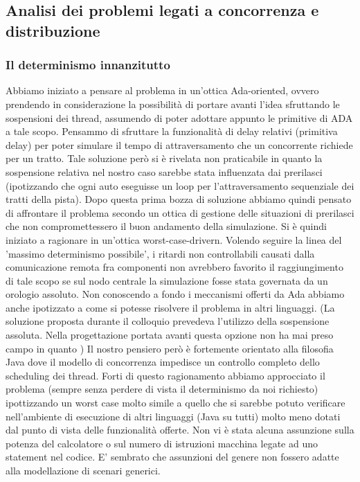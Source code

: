 \subsection{Analisi dei problemi legati a concorrenza e distribuzione}
\subsubsection{Il determinismo innanzitutto}
Abbiamo iniziato a pensare al problema in un'ottica Ada-oriented, ovvero prendendo in considerazione la possibilità di portare avanti l’idea sfruttando le sospensioni dei thread, assumendo di poter adottare appunto le primitive di ADA a tale scopo. Pensammo di sfruttare la funzionalità di delay relativi (primitiva delay) per poter simulare il tempo di attraversamento che un concorrente richiede per un tratto. Tale soluzione però si è rivelata non praticabile in quanto la sospensione relativa nel nostro caso sarebbe stata influenzata dai prerilasci (ipotizzando che ogni auto eseguisse un loop per l’attraversamento sequenziale dei tratti della pista). Dopo questa prima bozza di soluzione abbiamo quindi pensato di affrontare il problema secondo un ottica di gestione delle situazioni di prerilasci che non compromettessero il buon andamento della simulazione. Si è quindi iniziato a ragionare in un’ottica worst-case-drivern.
            Volendo seguire la linea del 'massimo determinismo possibile', i ritardi non controllabili causati dalla comunicazione remota fra componenti non avrebbero favorito il raggiungimento di tale scopo se sul nodo centrale la simulazione fosse stata governata da un orologio assoluto. Non conoscendo a fondo i meccanismi offerti da Ada abbiamo anche ipotizzato a come si potesse risolvere il problema in altri linguaggi.
            (La soluzione proposta durante il colloquio prevedeva l’utilizzo della sospensione assoluta. Nella progettazione portata avanti questa opzione non ha mai preso campo in quanto )
            Il nostro pensiero però è fortemente orientato alla filosofia Java dove il modello di concorrenza impedisce un controllo completo dello scheduling dei thread.
            Forti di questo ragionamento abbiamo approcciato il problema (sempre senza perdere di vista il determinismo da noi richiesto)  ipottizzando un worst case molto simile a quello che si sarebbe potuto verificare nell’ambiente di esecuzione di altri linguaggi (Java su tutti) molto meno dotati dal punto di vista delle funzionalità offerte.
            Non vi è stata alcuna assunzione sulla potenza del calcolatore o sul numero di istruzioni macchina legate ad uno statement nel codice. E’ sembrato che assunzioni del genere non fossero adatte alla modellazione di scenari generici.
